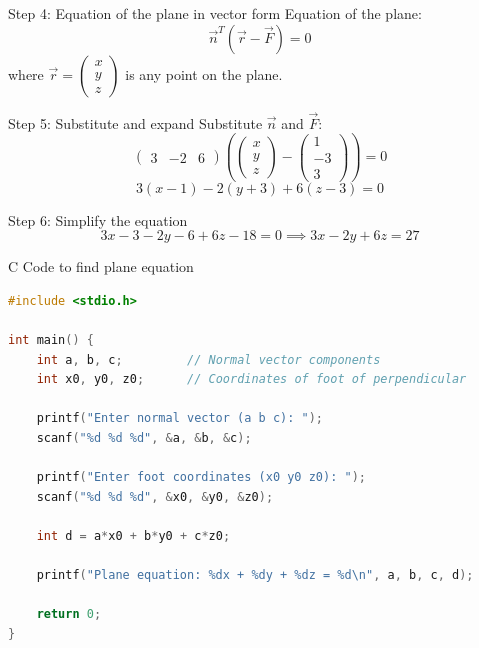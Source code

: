 \documentclass{beamer}
\begin{document}
\begin{frame}{Step 4: Equation of the plane in vector form}
    Equation of the plane:
    \[
    \vec{n}^T (\vec{r} - \vec{F}) = 0
    \]
    where \(\vec{r} = \begin{pmatrix} x \\ y \\ z \end{pmatrix}\) is any point on the plane.
\end{frame}

\begin{frame}{Step 5: Substitute and expand}
    Substitute \(\vec{n}\) and \(\vec{F}\):
    \[
    \begin{pmatrix} 3 & -2 & 6 \end{pmatrix} \left( \begin{pmatrix} x \\ y \\ z \end{pmatrix} - \begin{pmatrix} 1 \\ -3 \\ 3 \end{pmatrix} \right) = 0
    \]
    \[
    3(x-1) - 2(y+3) + 6(z-3) = 0
    \]
\end{frame}

\begin{frame}{Step 6: Simplify the equation}
    \[
    3x - 3 - 2y - 6 + 6z - 18 = 0 \implies 3x - 2y + 6z = 27
    \]
\end{frame}

\begin{frame}[fragile]{C Code to find plane equation}
\begin{lstlisting}[language=C]
#include <stdio.h>

int main() {
    int a, b, c;         // Normal vector components
    int x0, y0, z0;      // Coordinates of foot of perpendicular

    printf("Enter normal vector (a b c): ");
    scanf("%d %d %d", &a, &b, &c);

    printf("Enter foot coordinates (x0 y0 z0): ");
    scanf("%d %d %d", &x0, &y0, &z0);

    int d = a*x0 + b*y0 + c*z0;

    printf("Plane equation: %dx + %dy + %dz = %d\n", a, b, c, d);

    return 0;
}
\end{lstlisting}
\end{frame}
\end{document}
